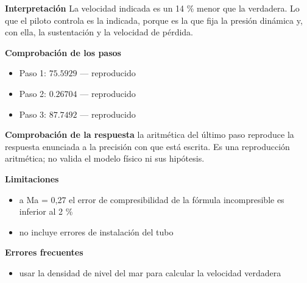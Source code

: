 \documentclass[10pt,openany]{book}
\begin{document}
\begin{tcolorbox}[title={Problema resuelto}, studiumworked, breakable]
\noindent\textbf{Interpretación}
La velocidad indicada es un 14 \% menor que la verdadera. Lo que el piloto controla es la indicada, porque es la que fija la presión dinámica y, con ella, la sustentación y la velocidad de pérdida.

\noindent\textbf{Comprobación de los pasos}
\begin{itemize}
\item Paso 1: $75.5929$ — reproducido
\item Paso 2: $0.26704$ — reproducido
\item Paso 3: $87.7492$ — reproducido
\end{itemize}

\noindent\textbf{Comprobación de la respuesta} la aritmética del último paso reproduce la respuesta enunciada a la precisión con que está escrita. Es una reproducción aritmética; no valida el modelo físico ni sus hipótesis.

\noindent\textbf{Limitaciones}
\begin{itemize}
\item a Ma = 0,27 el error de compresibilidad de la fórmula incompresible es inferior al 2 \%
\item no incluye errores de instalación del tubo
\end{itemize}

\noindent\textbf{Errores frecuentes}
\begin{itemize}
\item usar la densidad de nivel del mar para calcular la velocidad verdadera
\end{itemize}
\end{tcolorbox}
\end{document}
